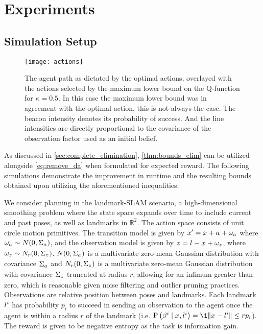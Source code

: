 \section{Experiments}
\subsection{Simulation Setup}
\begin{figure}[h]
	\centering
	\texttt{[image: actions]}
	\caption{The agent path as dictated by the optimal actions, overlayed with the actions selected by the maximum lower bound on the Q-function for $\kappa=0.5$. In this case the maximum lower bound was in agreement with the optimal action, this is not always the case. The beacon intensity denotes its probability of success. And the line intensities are directly proportional to the covariance of the observation factor used as an initial belief.}
	\label{fig:actions}
\end{figure}
As discussed in \cref{sec:complete_elimination}, \cref{thm:bounds_elim} can be utilized alongside \eqref{eq:remove_da} when formulated for expected reward. The following simulations demonstrate the improvement in runtime and the resulting bounds obtained upon utilizing the aforementioned inequalities.

We consider planning in the landmark-SLAM scenario, a high-dimensional smoothing problem where the state space expands over time to include current and past poses, as well as landmarks in $\mathbb{R}^2$. The action space consists of unit circle motion primitives. The transition model is given by $x_{}^\prime=x_{}+{a_{}}+\omega_{{a_{}}}$ where $\omega_{{a_{}}}\sim N(0,\Sigma_{{a_{}}})$, and the observation model is given by $z_{}^{}=l^{}-x_{}+\omega_{z_{}^{}}$, where $\omega_{z_{}^{}}\sim N_r(0,\Sigma_{z_{}^{}})$.  $N(0,\Sigma_{a_{}})$ is a multivariate zero-mean Gaussian distribution with covariance $\Sigma_{{a_{}}}$ and $N_r(0,\Sigma_{z_{}^{}})$ is a multivariate zero-mean Gaussian distribution with covariance $\Sigma_{z_{}^{}}$ truncated at radius $r$, allowing for an infimum greater than zero, which is reasonable given noise filtering and outlier pruning practices. Observations are relative position between poses and landmarks. Each landmark $l^{i}$ has probability $p_i$ to succeed in sending an observation to the agent once the agent is within a radius $r$ of the landmark (i.e. $\probcond{\da{}{i}}{\state{},\landmark{i}}=\1{\norm{\state{}-\landmark{i}}\leq r}p_i$). The reward is given to be negative entropy as the task is information gain.

